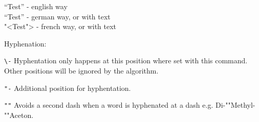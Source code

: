 \documentclass[10pt, a4paper]{article}
\begin{document}
``Test''  - english way\\
"`Test"'  - german way, or with \glqq text\grqq \\ 
"<Test"> - french way, or with \flqq text\frqq %

\vspace{1cm}
Hyphenation:

\verb+\-+ \quad Hyphentation only happens at this position where set with this command. Other positions will be ignored by the algorithm.

\verb+"-+ \quad Additional position for hyphentation.

\verb+""+ \quad Avoids a second dash when a word is hyphenated at a dash e.g. Di-""Methyl-""Aceton.
\end{document}
